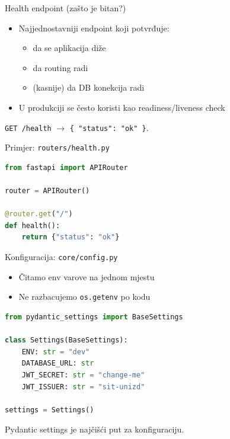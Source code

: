 \begin{frame}{Health endpoint (zašto je bitan?)}
\begin{itemize}
  \item Najjednostavniji endpoint koji potvrđuje:
  \begin{itemize}
    \item da se aplikacija diže
    \item da routing radi
    \item (kasnije) da DB konekcija radi
  \end{itemize}
  \item U produkciji se često koristi kao readiness/liveness check
\end{itemize}

\vspace{0.6em}
\texttt{GET /health} $\rightarrow$ \texttt{\{ "status": "ok" \}}.
\end{frame}

\begin{frame}[fragile,shrink=5]{Primjer: \texttt{routers/health.py}}
\begin{lstlisting}[language=python]
from fastapi import APIRouter

router = APIRouter()

@router.get("/")
def health():
    return {"status": "ok"}
\end{lstlisting}
\end{frame}

\begin{frame}[fragile,shrink=5]{Konfiguracija: \texttt{core/config.py}}
\begin{itemize}
  \item Čitamo env varove na jednom mjestu
  \item Ne razbacujemo \texttt{os.getenv} po kodu
\end{itemize}

\begin{lstlisting}[language=python]
from pydantic_settings import BaseSettings

class Settings(BaseSettings):
    ENV: str = "dev"
    DATABASE_URL: str
    JWT_SECRET: str = "change-me"
    JWT_ISSUER: str = "sit-unizd"

settings = Settings()
\end{lstlisting}

\vspace{0.4em}
Pydantic settings je najčišći put za konfiguraciju.
\end{frame}

